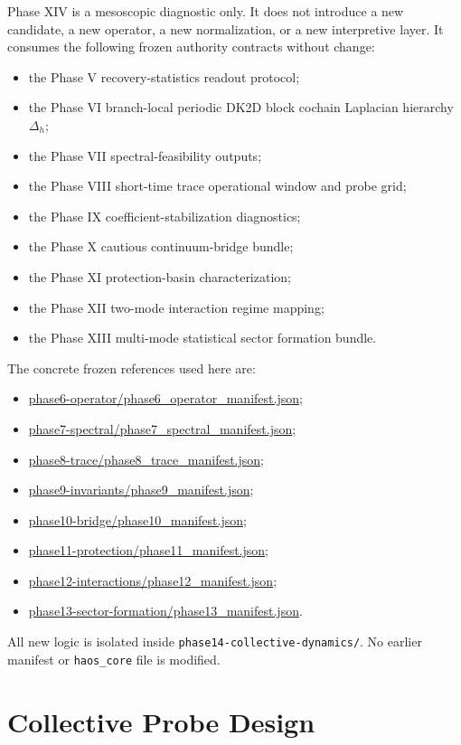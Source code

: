 \documentclass[11pt]{article}
\begin{document}
Phase XIV is a mesoscopic diagnostic only. It does not introduce a new candidate, a new operator, a new normalization, or a new interpretive layer. It consumes the following frozen authority contracts without change:
\begin{itemize}
\item the Phase V recovery-statistics readout protocol;
\item the Phase VI branch-local periodic DK2D block cochain Laplacian hierarchy $\Delta_h$;
\item the Phase VII spectral-feasibility outputs;
\item the Phase VIII short-time trace operational window and probe grid;
\item the Phase IX coefficient-stabilization diagnostics;
\item the Phase X cautious continuum-bridge bundle;
\item the Phase XI protection-basin characterization;
\item the Phase XII two-mode interaction regime mapping;
\item the Phase XIII multi-mode statistical sector formation bundle.
\end{itemize}

The concrete frozen references used here are:
\begin{itemize}
\item \url{phase6-operator/phase6_operator_manifest.json};
\item \url{phase7-spectral/phase7_spectral_manifest.json};
\item \url{phase8-trace/phase8_trace_manifest.json};
\item \url{phase9-invariants/phase9_manifest.json};
\item \url{phase10-bridge/phase10_manifest.json};
\item \url{phase11-protection/phase11_manifest.json};
\item \url{phase12-interactions/phase12_manifest.json};
\item \url{phase13-sector-formation/phase13_manifest.json}.
\end{itemize}

All new logic is isolated inside \texttt{phase14-collective-dynamics/}. No earlier manifest or \texttt{haos\_core} file is modified.

\section{Collective Probe Design}
\end{document}

